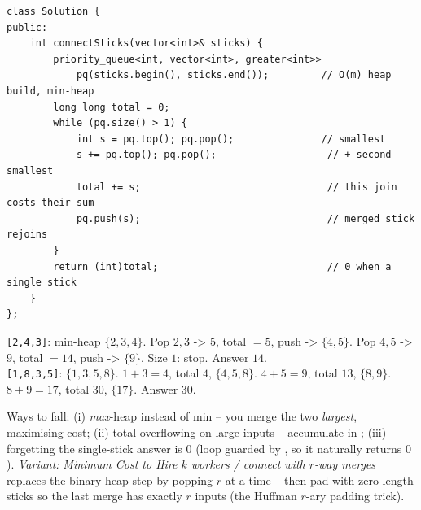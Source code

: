 \begin{lstlisting}[caption={Minimum Cost to Connect Sticks -- min-heap extract-two-push-one (LeetCode 1167)}, label={lst:c07-connect-soln}]
class Solution {
public:
    int connectSticks(vector<int>& sticks) {
        priority_queue<int, vector<int>, greater<int>>
            pq(sticks.begin(), sticks.end());         // O(m) heap build, min-heap
        long long total = 0;
        while (pq.size() > 1) {
            int s = pq.top(); pq.pop();               // smallest
            s += pq.top(); pq.pop();                   // + second smallest
            total += s;                                // this join costs their sum
            pq.push(s);                                // merged stick rejoins
        }
        return (int)total;                             // 0 when a single stick
    }
};
\end{lstlisting}

\begin{tracebox}
\texttt{[2,4,3]}: min-heap $\{2,3,4\}$. Pop $2,3$ -> $5$, total $=5$, push -> $\{4,5\}$. Pop $4,5$ -> $9$,
total $=14$, push -> $\{9\}$. Size $1$: stop. Answer $14$. \checkmark\\
\texttt{[1,8,3,5]}: $\{1,3,5,8\}$. $1{+}3{=}4$, total $4$, $\{4,5,8\}$. $4{+}5{=}9$, total $13$, $\{8,9\}$.
$8{+}9{=}17$, total $30$, $\{17\}$. Answer $30$. \checkmark
\end{tracebox}


\begin{warningbox}
Ways to fall: (i) \emph{max}-heap instead of min -- you merge the two \emph{largest}, maximising cost; (ii)
 total overflowing on large inputs -- accumulate in ; (iii) forgetting the
single-stick answer is $0$ (loop guarded by , so it naturally returns $0$). \emph{Variant:}
\emph{Minimum Cost to Hire $k$ workers / connect with $r$-way merges} replaces the binary heap step by
popping $r$ at a time -- then pad with zero-length sticks so the last merge has exactly $r$ inputs (the
Huffman $r$-ary padding trick).
\end{warningbox}

